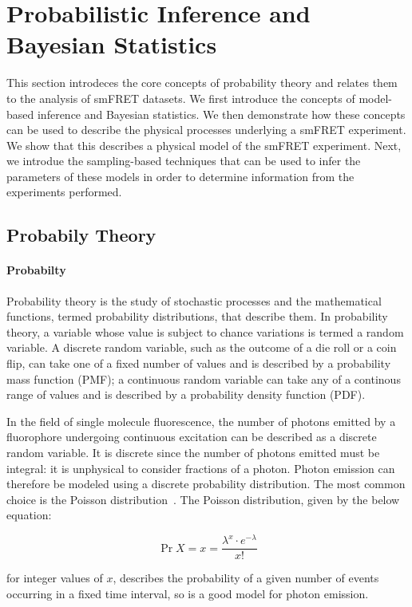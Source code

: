 \section{Probabilistic Inference and Bayesian Statistics}
This section introdeces the core concepts of probability theory and relates them to the analysis of smFRET datasets. We first introduce the concepts of model-based inference and Bayesian statistics. We then demonstrate how these concepts can be used to describe the physical processes underlying a smFRET experiment. We show that this describes a physical model of the smFRET experiment. Next, we introdue the sampling-based techniques that can be used to infer the parameters of these models in order to determine information from the experiments performed.   

\subsection{Probabily Theory}
\paragraph{Probabilty}
Probability theory is the study of stochastic processes and the mathematical functions, termed probability distributions, that describe them. In probability theory, a variable whose value is subject to chance variations is termed a random variable. A discrete random variable, such as the outcome of a die roll or a coin flip, can take one of a fixed number of values and is described by a probability mass function (PMF); a continuous random variable can take any of a continous range of values and is described by a probability density function (PDF). 

In the field of single molecule fluorescence, the number of photons emitted by a fluorophore undergoing continuous excitation can be described as a discrete random variable. It is discrete since the number of photons emitted must be integral: it is unphysical to consider fractions of a photon. Photon emission can therefore be modeled using a discrete probability distribution. The most common choice is the Poisson distribution~\cite{???}. The Poisson distribution, given by the below equation:

\begin{equation}
\Pr{X = x} = \frac{\lambda^x \cdot e^{-\lambda}}{x!}
\label{eq:poisson}
\end{equation}
 
for integer values of $x$, describes the probability of a given number of events occurring in a fixed time interval, so is a good model for photon emission. 


